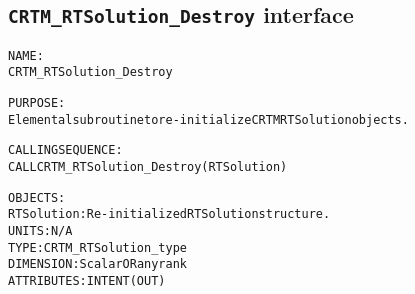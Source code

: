 \subsection{\texttt{CRTM\_RTSolution\_Destroy} interface}
  \label{sec:CRTM_RTSolution_Destroy_interface}
  \begin{alltt}
 
  NAME:
        CRTM_RTSolution_Destroy
 
  PURPOSE:
        Elemental subroutine to re-initialize CRTM RTSolution objects.
 
  CALLING SEQUENCE:
        CALL CRTM_RTSolution_Destroy( RTSolution )
 
  OBJECTS:
        RTSolution:   Re-initialized RTSolution structure.
                      UNITS:      N/A
                      TYPE:       CRTM_RTSolution_type
                      DIMENSION:  Scalar OR any rank
                      ATTRIBUTES: INTENT(OUT)
 
  \end{alltt}
